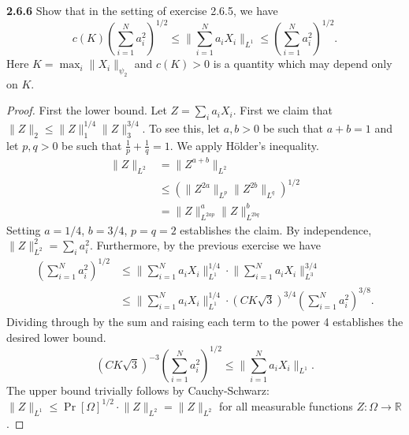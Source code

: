 \documentclass[11pt,letterpaper]{report}
\newcommand{\reals}{\mathbb{R}}
\newcommand{\subg}[1]{\|{#1}\|_{\psi_2}}
\newcommand{\Lp}[2]{\big\|{#1}\big\|_{L^{#2}}}
\begin{document}
\noindent\textbf{2.6.6}
Show that in the setting of exercise 2.6.5, we have
\[
c(K)\left(\sum_{i=1}^Na_i^2\right)^{1/2} \leq \Lp{\sum_{i=1}^Na_iX_i}{1} \leq \left(\sum_{i=1}^Na_i^2\right)^{1/2}.
\]
Here $K = \max_i\subg{X_i}$ and $c(K) > 0$ is a quantity which may depend only on $K$.
\begin{proof}
	First the lower bound. Let $Z = \sum_i a_i X_i$. First we claim that $\|Z\|_2 \leq \|Z\|_1^{1/4}\|Z\|_3^{3/4}$. To see this, let $a,b>0$ be such that $a+b= 1$ and let $p,q>0$ be such that $\frac{1}{p} + \frac{1}{q} = 1$. We apply H\"older's inequality.
	\begin{align*}
		\Lp{Z}{2} &= \Lp{Z^{a+b}}{2}\\
		&\leq \left(\Lp{Z^{2a}}{p}\Lp{Z^{2b}}{q} \right)^{1/2}\\
		&=\Lp{Z}{2ap}^{a}\Lp{Z}{2bq}^{b}
	\end{align*}
	Setting $a = 1/4$, $b = 3/4$, $p=q=2$ establishes the claim. By independence, $\Lp{Z}{2}^2 = \sum_i a_i^2$. Furthermore, by the previous exercise we have
	\begin{align*}
	\left(\sum_{i=1}^Na_i^2\right)^{1/2} &\leq \Lp{\sum_{i=1}^Na_iX_i}{1}^{1/4}\cdot \Lp{\sum_{i=1}^Na_iX_i}{3}^{3/4}\\
	&\leq \Lp{\sum_{i=1}^Na_iX_i}{1}^{1/4}\cdot (CK\sqrt{3})^{3/4}\left(\sum_{i=1}^Na_i^2\right)^{3/8}.
	\end{align*}
	Dividing through by the sum and raising each term to the power 4 establishes the desired lower bound.
	\[
	(CK\sqrt{3})^{-3}\left(\sum_{i=1}^Na_i^2\right)^{1/2}\leq \Lp{\sum_{i=1}^Na_iX_i}{1}.
	\]
	The upper bound trivially follows by Cauchy-Schwarz: $\Lp{Z}{1} \leq \Pr[\Omega]^{1/2}\cdot \Lp{Z}{2} = \Lp{Z}{2}$ for all measurable functions $Z:\Omega\to \reals$.
\end{proof}
\end{document}

